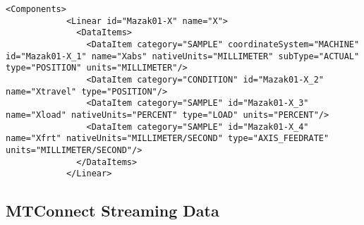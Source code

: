 \begin{lstlisting}[firstnumber=last,%
    caption={Components},label={lst:axis-data-items}]
          <Components>
            <Linear id="Mazak01-X" name="X">
              <DataItems>
                <DataItem category="SAMPLE" coordinateSystem="MACHINE" id="Mazak01-X_1" name="Xabs" nativeUnits="MILLIMETER" subType="ACTUAL" type="POSITION" units="MILLIMETER"/>
                <DataItem category="CONDITION" id="Mazak01-X_2" name="Xtravel" type="POSITION"/>
                <DataItem category="SAMPLE" id="Mazak01-X_3" name="Xload" nativeUnits="PERCENT" type="LOAD" units="PERCENT"/>
                <DataItem category="SAMPLE" id="Mazak01-X_4" name="Xfrt" nativeUnits="MILLIMETER/SECOND" type="AXIS_FEEDRATE" units="MILLIMETER/SECOND"/>
              </DataItems>
            </Linear>
\end{lstlisting}

\FloatBarrier

\subsection{MTConnect Streaming Data}
